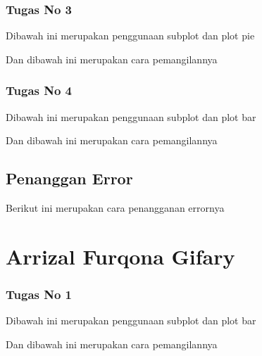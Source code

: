 \subsubsection{Tugas No 3}

\hfill \break

Dibawah ini merupakan penggunaan subplot dan plot pie

Dan dibawah ini merupakan cara pemangilannya



\subsubsection{Tugas No 4}

\hfill \break

Dibawah ini merupakan penggunaan subplot dan plot bar

Dan dibawah ini merupakan cara pemangilannya



\subsection{Penanggan Error}

\hfill \break

Berikut ini merupakan cara penangganan errornya

\section {Arrizal Furqona Gifary}
\subsubsection{Tugas No 1}
\hfill \break
Dibawah ini merupakan penggunaan subplot dan plot bar

Dan dibawah ini merupakan cara pemangilannya



